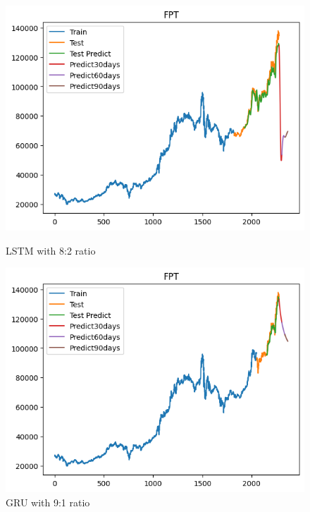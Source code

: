 \documentclass[conference]{IEEEtran}
\begin{document}
\begin{figure}[H]
    \centering
    \begin{minipage}{0.24\textwidth}
        \centering
        \includegraphics[width=\textwidth]{Figure/FPT/lstm82.png}
        \caption{LSTM with 8:2 ratio}
        \label{fig:image1}
    \end{minipage}
    \hfill
    \begin{minipage}{0.24\textwidth}
        \centering
        \includegraphics[width=\textwidth]{Figure/FPT/gru91.png}
        \caption{GRU with 9:1 ratio}
        \label{fig:image2}
    \end{minipage}
\end{figure}
\end{document}
